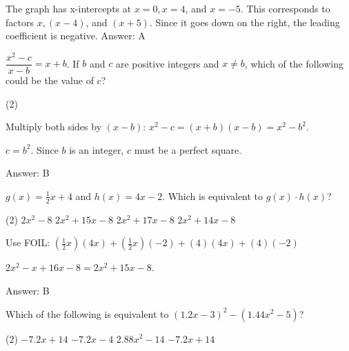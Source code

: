 \documentclass[11pt,paper=a4,answers]{exam}
\begin{document}
\begin{questions}
\begin{solution}
The graph has x-intercepts at $x=0, x=4$, and $x=-5$. This corresponds to factors $x, (x-4)$, and $(x+5)$. Since it goes down on the right, the leading coefficient is negative.
\vspace{5pt}
Answer: \colorbox{yellow!100}{A}
\end{solution}

\vspace{1cm}

\question
$\dfrac{x^2 - c}{x - b} = x + b$. If $b$ and $c$ are positive integers and $x \neq b$, which of the following could be the value of $c$?
\begin{tasks}(2)
       
\end{tasks}

\begin{solution}
Multiply both sides by $(x-b)$: $x^2 - c = (x+b)(x-b) = x^2 - b^2$.
\vspace{5pt}
\begin{center}
$c = b^2$. Since $b$ is an integer, $c$ must be a perfect square.
\end{center}
\vspace{5pt}
Answer: \colorbox{yellow!100}{B}
\end{solution}

\vspace{1cm}

\question
$g(x) = \frac{1}{2}x + 4$ and $h(x) = 4x - 2$. Which is equivalent to $g(x) \cdot h(x)$?
\begin{tasks}(2)
    \task $2x^2 - 8$
    \task $2x^2 + 15x - 8$
    \task $2x^2 + 17x - 8$
    \task $2x^2 + 14x - 8$
\end{tasks}

\begin{solution}
Use FOIL: $(\frac{1}{2}x)(4x) + (\frac{1}{2}x)(-2) + (4)(4x) + (4)(-2)$
\vspace{5pt}
\begin{center}
$2x^2 - x + 16x - 8 = 2x^2 + 15x - 8$.
\end{center}
\vspace{5pt}
Answer: \colorbox{yellow!100}{B}
\end{solution}

\vspace{1cm}

\question
Which of the following is equivalent to $(1.2x - 3)^2 - (1.44x^2 - 5)$?
\begin{tasks}(2)
    \task $-7.2x + 14$ \task $-7.2x - 4$ \task $2.88x^2 - 14$ \task $-7.2x + 14$
\end{tasks}


\end{questions}
\end{document}
